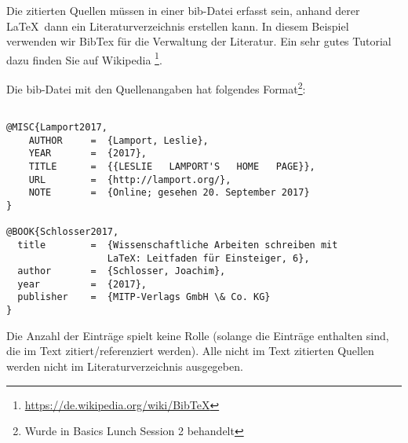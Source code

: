 
Die zitierten Quellen müssen in einer bib-Datei erfasst sein, anhand derer \LaTeX\ dann ein Literaturverzeichnis erstellen kann. In diesem Beispiel verwenden wir BibTex für die Verwaltung der Literatur. Ein sehr gutes Tutorial dazu finden Sie auf Wikipedia \footnote{\url{https://de.wikipedia.org/wiki/BibTeX}}.

Die bib-Datei mit den Quellenangaben hat folgendes Format\footnote{Wurde in Basics Lunch Session 2 behandelt}:

\begin{miniSeite}[colbacktitle=black!35!white,title=\LaTeX\ bib-Datei]

\begin{verbatim}

@MISC{Lamport2017,
    AUTHOR     =  {Lamport, Leslie},
    YEAR       =  {2017},
    TITLE      =  {{LESLIE   LAMPORT'S   HOME   PAGE}},
    URL        =  {http://lamport.org/},
    NOTE       =  {Online; gesehen 20. September 2017}
}

@BOOK{Schlosser2017,
  title        =  {Wissenschaftliche Arbeiten schreiben mit
                  LaTeX: Leitfaden für Einsteiger, 6},
  author       =  {Schlosser, Joachim},
  year         =  {2017},
  publisher    =  {MITP-Verlags GmbH \& Co. KG}
}

\end{verbatim}

\end{miniSeite}

Die Anzahl der Einträge spielt keine Rolle (solange die Einträge enthalten sind, die im Text zitiert/referenziert werden). Alle nicht im Text zitierten Quellen werden nicht im Literaturverzeichnis ausgegeben.